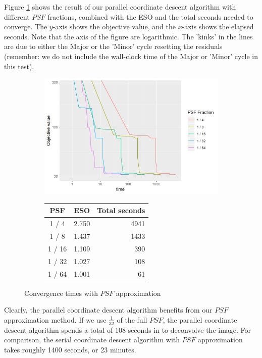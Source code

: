 Figure \ref{pcdm:results:psf} shows the result of our parallel coordinate descent algorithm with different $PSF$ fractions, combined with the ESO and the total seconds needed to converge. The $y$-axis shows the objective value, and the $x$-axis shows the elapsed seconds. Note that the axis of the figure are logarithmic. The 'kinks' in the lines are due to either the Major or the 'Minor' cycle resetting the residuals (remember: we do not include the wall-clock time of the Major or 'Minor' cycle in this test).

\begin{figure}[h]
	\centering
	\begin{subfigure}{0.6\linewidth}
		\includegraphics[width=1.0\linewidth]{./chapters/05.pcdm/parameters/psfSize.png}
	\end{subfigure}
	\begin{subfigure}{0.35\linewidth}
		\begin{tabular}{c | r | r}
			PSF & ESO & Total seconds \\ \hline
			1 / 4 & 2.750 & 4941 \\
			1 / 8 & 1.437 & 1433 \\
			1 / 16 & 1.109 & 390 \\
			1 / 32 & 1.027 & 108 \\
			1 / 64 & 1.001 & 61 \\
		\end{tabular}
	\end{subfigure}
	\caption{Convergence times with $PSF$ approximation}
	\label{pcdm:results:psf}
\end{figure}

Clearly, the parallel coordinate descent algorithm benefits from our $PSF$ approximation method. If we use $\frac{1}{32}$ of the full $PSF$, the parallel coordinate descent algorithm spends a total of 108 seconds in to deconvolve the image. For comparison, the serial coordinate descent algorithm with $PSF$ approximation takes roughly 1400 seconds, or 23 minutes.

